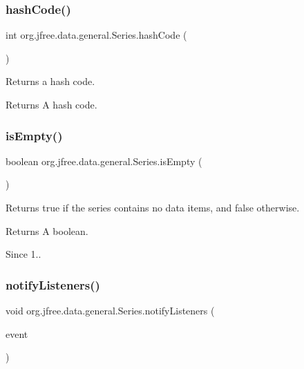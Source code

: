 \subsubsection{\texorpdfstring{hash\+Code()}{hashCode()}}
{\footnotesize\ttfamily int org.\+jfree.\+data.\+general.\+Series.\+hash\+Code (\begin{DoxyParamCaption}{ }\end{DoxyParamCaption})}

Returns a hash code.

\begin{DoxyReturn}{Returns}
A hash code. 
\end{DoxyReturn}
\mbox{\label{classorg_1_1jfree_1_1data_1_1general_1_1_series_aa9ff89ce98672029f036d2063b56704c}} 
\subsubsection{\texorpdfstring{is\+Empty()}{isEmpty()}}
{\footnotesize\ttfamily boolean org.\+jfree.\+data.\+general.\+Series.\+is\+Empty (\begin{DoxyParamCaption}{ }\end{DoxyParamCaption})}

Returns {\ttfamily true} if the series contains no data items, and {\ttfamily false} otherwise.

\begin{DoxyReturn}{Returns}
A boolean.
\end{DoxyReturn}
\begin{DoxySince}{Since}
1.. 
\end{DoxySince}
\mbox{\label{classorg_1_1jfree_1_1data_1_1general_1_1_series_a6c728147cd28460113771d4e69086a62}} 
\subsubsection{\texorpdfstring{notify\+Listeners()}{notifyListeners()}}
{\footnotesize\ttfamily void org.\+jfree.\+data.\+general.\+Series.\+notify\+Listeners (\begin{DoxyParamCaption}\item[{\mbox{\hyperlink{classorg_1_1jfree_1_1data_1_1general_1_1_series_change_event}{Series\+Change\+Event}}}]{event }\end{DoxyParamCaption})\hspace{0.3cm}{\ttfamily [protected]}}

